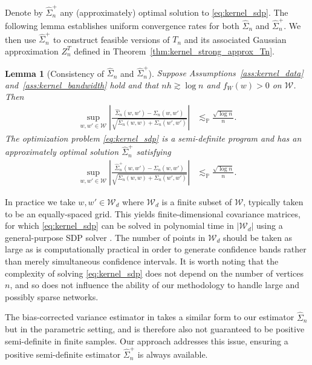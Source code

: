 \documentclass[11pt,lof]{puthesis}
\renewcommand{\P}{\ensuremath{\mathbb{P}}}
\newcommand{\cW}{\ensuremath{\mathcal{W}}}
\theoremstyle{break}
\newtheorem{lemma}{Lemma}[section]
\theoremstyle{proof}
\begin{document}
Denote by $\hat\Sigma_n^+$ any (approximately) optimal solution to
\eqref{eq:kernel_sdp}. The following lemma establishes uniform convergence rates
for both $\hat \Sigma_n$ and $\hat \Sigma_n^+$.
We then use $\hat \Sigma_n^+$ to construct feasible versions of $T_n$ and its
associated Gaussian approximation $Z_n^{T}$ defined in
Theorem~\ref{thm:kernel_strong_approx_Tn}.
%
\begin{lemma}[Consistency of $\hat \Sigma_n$ and $\hat \Sigma_n^+$]
  \label{lem:kernel_sdp}
  Suppose Assumptions~\ref{ass:kernel_data} and~\ref{ass:kernel_bandwidth} hold
  and that $n h \gtrsim \log n$ and $f_W(w) > 0$ on $\cW$. Then
  \begin{align*}
    \sup_{w,w' \in \cW}
    \left| \frac{\hat \Sigma_n(w,w') - \Sigma_n(w,w')}
    {\sqrt{\Sigma_n(w,w) + \Sigma_n(w',w')}} \right|
    &\lesssim_\P \frac{\sqrt{\log n}}{n}.
  \end{align*}
  The optimization problem \eqref{eq:kernel_sdp} is a semi-definite
  program
  \citep[SDP,][]{laurent2005semidefinite} and has an approximately optimal
  solution $\hat\Sigma_n^+$ satisfying
  \begin{align*}
    \sup_{w,w' \in \cW} \left|
    \frac{\hat \Sigma_n^+(w,w') - \Sigma_n(w,w')}
    {\sqrt{\Sigma_n(w,w) + \Sigma_n(w',w')}} \right|
    &\lesssim_\P \frac{\sqrt{\log n}}{n}.
  \end{align*}
\end{lemma}

In practice we take $w, w' \in \cW_d$ where $\cW_d$ is a finite subset of
$\cW$, typically taken to be an equally-spaced grid. This yields
finite-dimensional covariance matrices, for which \eqref{eq:kernel_sdp} can be
solved in polynomial time in $|\cW_d|$ using a general-purpose SDP solver
\citep[e.g.\ by interior point methods,][]{laurent2005semidefinite}.
The number of points in $\cW_d$ should be taken as large as is computationally
practical in order to generate confidence bands rather than merely simultaneous
confidence intervals. It is worth noting that the complexity of solving
\eqref{eq:kernel_sdp} does not depend on the number of vertices $n$, and so
does not
influence the ability of our methodology to handle large and possibly sparse
networks.

The bias-corrected variance estimator in
\citet[Section~3.2]{matsushita2021jackknife} takes a similar form to our
estimator $\hat\Sigma_n$ but in the parametric setting, and is therefore also
not guaranteed to be positive semi-definite in finite samples. Our approach
addresses this issue, ensuring a positive semi-definite estimator
$\hat\Sigma_n^+$ is always available.
\end{document}
